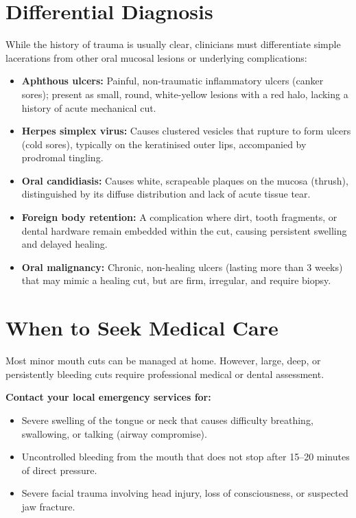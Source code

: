 \section*{Differential Diagnosis}
While the history of trauma is usually clear, clinicians must differentiate simple lacerations from other oral mucosal lesions or underlying complications:
\begin{itemize}
    \item \textbf{Aphthous ulcers:} Painful, non-traumatic inflammatory ulcers (canker sores); present as small, round, white-yellow lesions with a red halo, lacking a history of acute mechanical cut.
    \item \textbf{Herpes simplex virus:} Causes clustered vesicles that rupture to form ulcers (cold sores), typically on the keratinised outer lips, accompanied by prodromal tingling.
    \item \textbf{Oral candidiasis:} Causes white, scrapeable plaques on the mucosa (thrush), distinguished by its diffuse distribution and lack of acute tissue tear.
    \item \textbf{Foreign body retention:} A complication where dirt, tooth fragments, or dental hardware remain embedded within the cut, causing persistent swelling and delayed healing.
    \item \textbf{Oral malignancy:} Chronic, non-healing ulcers (lasting more than 3 weeks) that may mimic a healing cut, but are firm, irregular, and require biopsy.
\end{itemize}

\section*{When to Seek Medical Care}
Most minor mouth cuts can be managed at home. However, large, deep, or persistently bleeding cuts require professional medical or dental assessment.

\textbf{Contact your local emergency services for:}
\begin{itemize}
    \item Severe swelling of the tongue or neck that causes difficulty breathing, swallowing, or talking (airway compromise).
    \item Uncontrolled bleeding from the mouth that does not stop after 15--20 minutes of direct pressure.
    \item Severe facial trauma involving head injury, loss of consciousness, or suspected jaw fracture.
\end{itemize}

